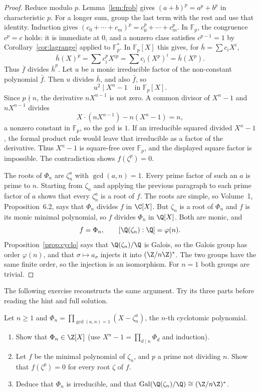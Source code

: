 \begin{proof}
Reduce modulo $p$. Lemma~\ref{lem:frob} gives $(a+b)^p=a^p+b^p$ in characteristic $p$. For a longer sum, group the last term with the rest and use that identity. Induction gives $(c_0+\cdots+c_m)^p=c_0^p+\cdots+c_m^p$. In $\mathbb F_p$, the congruence $c^p=c$ holds: it is immediate at $0$, and a nonzero class satisfies $c^{p-1}=1$ by Corollary~\ref{cor:lagrange} applied to $\mathbb F_p^*$. In $\mathbb F_p[X]$ this gives, for $\bar h=\sum c_iX^i$,
\[
\bar h(X)^p=\sum c_i^p X^{ip}=\sum c_i(X^p)^i=\bar h(X^p).
\]
Thus $\bar f$ divides $\bar h^p$. Let $u$ be a monic irreducible factor of the non-constant polynomial $\bar f$. Then $u$ divides $\bar h$, and also $\bar f$, so
\[
u^2\mid X^n-1\quad\text{in }\mathbb F_p[X].
\]
Since $p\nmid n$, the derivative $nX^{n-1}$ is not zero. A common divisor of $X^n-1$ and $nX^{n-1}$ divides
\[
X\cdot(nX^{n-1})-n(X^n-1)=n,
\]
a nonzero constant in $\mathbb F_p$, so the gcd is $1$. If an irreducible squared divided $X^n-1$, the formal product rule would leave that irreducible as a factor of the derivative. Thus $X^n-1$ is square-free over $\mathbb F_p$, and the displayed square factor is impossible. The contradiction shows $f(\zeta^p)=0$.

The roots of $\Phi_n$ are $\zeta_n^a$ with $\gcd(a,n)=1$. Every prime factor of such an $a$ is prime to $n$. Starting from $\zeta_n$ and applying the previous paragraph to each prime factor of $a$ shows that every $\zeta_n^a$ is a root of $f$. The roots are simple, so Volume~1, Proposition~6.2, says that $\Phi_n$ divides $f$ in $\C[X]$. But $\zeta_n$ is a root of $\Phi_n$ and $f$ is its monic minimal polynomial, so $f$ divides $\Phi_n$ in $\Q[X]$. Both are monic, and
\[
f=\Phi_n,\qquad [\Q(\zeta_n):\Q]=\varphi(n).
\]
Proposition~\ref{prop:cyclo} says that $\Q(\zeta_n)/\Q$ is Galois, so the Galois group has order $\varphi(n)$, and that $\sigma\mapsto a_\sigma$ injects it into $(\Z/n\Z)^*$. The two groups have the same finite order, so the injection is an isomorphism. For $n=1$ both groups are trivial.
\end{proof}

The following exercise reconstructs the same argument. Try its three parts before reading the hint and full solution.

\begin{exercise}[$\star\star\star$]\label{ex:phin}
Let $n\ge1$ and $\Phi_n=\prod_{\gcd(a,n)=1}(X-\zeta_n^a)$, the $n$-th cyclotomic polynomial.
\begin{enumerate}[label=(\alph*)]
\item Show that $\Phi_n\in\Z[X]$ (use $X^n-1=\prod_{d\mid n}\Phi_d$ and induction).
\item Let $f$ be the minimal polynomial of $\zeta_n$, and $p$ a prime not dividing $n$. Show that $f(\zeta^p)=0$ for every root $\zeta$ of $f$.
\item Deduce that $\Phi_n$ is irreducible, and that $\operatorname{Gal}(\Q(\zeta_n)/\Q)\cong(\Z/n\Z)^*$.
\end{enumerate}
\end{exercise}

